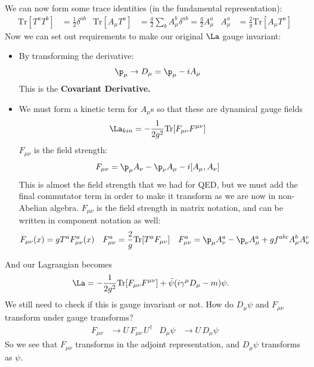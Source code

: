 \documentclass[relqm.tex]{subfiles}
\begin{document}
We can now form some trace identities (in the fundamental representation):
\begin{align}
    \text{Tr}[T^aT^b] &= \frac12\delta^{ab} & \text{Tr}[A_\mu T^a] &= \frac{g}{2}\sum_b A_\mu^b\delta^{ab} = \frac{g}{2}A_\mu^a & A_\mu^a &= \frac{2}{g}\text{Tr}[A_\mu T^a]
\end{align}
Now we can set out requirements to make our original $\La$ gauge invariant:
\begin{itemize}
    \item By transforming the derivative:
        \begin{align}
            \p_\mu &\to D_\mu = \p_\mu - iA_\mu
        \end{align}
        This is the \textbf{Covariant Derivative.}
    \item We must form a kinetic term for $A_\mu$s so that these are dynamical gauge fields
        \begin{align}
            \La_{kin} &= -\frac{1}{2g^2}\text{Tr}[F_{\mu\nu}F^{\mu\nu}]
        \end{align}
        $F_{\mu\nu}$ is the field strength:
        \begin{align}
            F_{\mu\nu} &= \p_\mu A_\nu - \p_\nu A_\mu - i[A_\mu,A_\nu]
        \end{align}
        This is almost the field strength that we had for QED, but we must add the final commutator term in order to make it transform as we are now in non-Abelian algebra. 
        $F_{\mu\nu}$ is the field strength in matrix notation, and can be written in component notation as well:
        \begin{align}
            F_{\mu\nu}(x) &= gT^aF^a_{\mu\nu}(x) & 
            F^a_{\mu\nu} &= \frac2g \text{Tr}[T^aF_{\mu\nu}] &
            F_{\mu\nu}^a &= \p_\mu A_\nu^a - \p_\nu A_\mu^a + gf^{abc}A_\mu^bA_\nu^c
        \end{align}
\end{itemize}
And our Lagrangian becomes
\begin{align}
    \La &= -\frac{1}{2g^2}\text{Tr}[F_{\mu\nu}F^{\mu\nu}] + \bar{\psi}(i\gamma^\mu D_\mu - m)\psi.
\end{align}
We still need to check if this is gauge invariant or not. 
How do $D_\mu\psi$ and $F_{\mu\nu}$ transform under gauge transforms?
\begin{align}
    F_{\mu\nu} &\to U\,F_{\mu\nu}\,U^\dagger & D_\mu\psi &\to U\,D_\mu\psi
\end{align}
So we see that $F_{\mu\nu}$ transforms in the adjoint representation, and $D_\mu\psi$ transforms as $\psi$.
\end{document}
